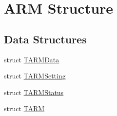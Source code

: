 \hypertarget{group___arm_strc}{\section{A\-R\-M Structure}
\label{group___arm_strc}
}
\subsection*{Data Structures}
\begin{DoxyCompactItemize}
\item 
struct \hyperlink{struct_t_a_r_m_data}{T\-A\-R\-M\-Data}
\item 
struct \hyperlink{struct_t_a_r_m_setting}{T\-A\-R\-M\-Setting}
\item 
struct \hyperlink{struct_t_a_r_m_status}{T\-A\-R\-M\-Status}
\item 
struct \hyperlink{struct_t_a_r_m}{T\-A\-R\-M}
\end{DoxyCompactItemize}
